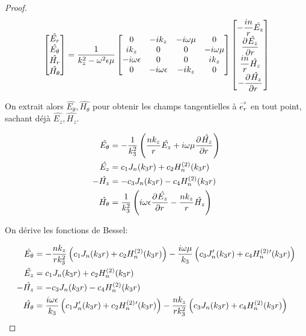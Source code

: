 \begin{proof}
    \begin{equation}
      \begin{bmatrix}
        \hat{E_r}\\
        \hat{E_\theta}\\
        \hat{H_r}\\
        \hat{H_\theta}
      \end{bmatrix} =
      \frac{1}{k_z^2 - \w^2\eps\mu}
      \begin{bmatrix}
      0 & -ik_z & -i\w\mu & 0
      \\
      ik_z & 0 & 0 & -i\w\mu
      \\
      -i\w\eps & 0 & 0 & ik_z
      \\
      0 & -i\w\eps & -ik_z & 0
      \end{bmatrix}
      \begin{bmatrix}
        -\frac{in}{r}\hat{E_z}\\
        \ddr{r}{\hat{E_z}}\\
        \frac{in}{r}\hat{H_z}\\
        -\ddr{r}{\hat{H_z}}
      \end{bmatrix}
    \end{equation}

    On extrait alors \(\hat{E_\theta}, \hat{H_\theta}\) pour obtenir les champs tangentielles à \(\vect{e_r}\) en tout point, sachant déjà \(\hat{E_z}, \hat{H_z}\).

    \begin{align}
      \hat{E_\theta} &= -\frac{1}{k_3^2}\left(\frac{nk_z}{r}\hat{E_z} + i\w\mu\ddr{r}{\hat{H_z}}\right)
      \\
      \hat{E_z} &= c_1 J_n(k_3 r) + c_2 H_n^{(2)}(k_3 r)
      \\
      -\hat{H_z} &= -c_3 J_n(k_3 r) - c_4 H_n^{(2)}(k_3 r)
      \\
      \hat{H_\theta} &= \frac{1}{k_3^2}\left(i\w\eps\ddr{r}{\hat{E_z}} - \frac{nk_z}{r}\hat{H_z}\right)
    \end{align}

    On dérive les fonctions de Bessel:

     \begin{align}
      \hat{E_\theta} &= -\frac{nk_z}{rk_3^2}\left(c_1J_n(k_3r) + c_2 H_n^{(2)}(k_3r)\right) - \frac{i\w\mu}{k_3}\left(c_3J_n'(k_3r) + c_4 H_n^{(2)}{}'(k_3r)\right)
      \\
      \hat{E_z} &= c_1 J_n(k_3 r) + c_2 H_n^{(2)}(k_3 r)
      \\
      -\hat{H_z} &= -c_3 J_n(k_3 r) - c_4 H_n^{(2)}(k_3 r)
      \\
      \hat{H_\theta} &= \frac{i\w\eps}{k_3}\left(c_1J_n'(k_3r) + c_2 H_n^{(2)}{}'(k_3r)\right) - \frac{nk_z}{rk_3^2}\left(c_3J_n(k_3r) + c_4 H_n^{(2)}(k_3r)\right)
    \end{align}


\end{proof}
